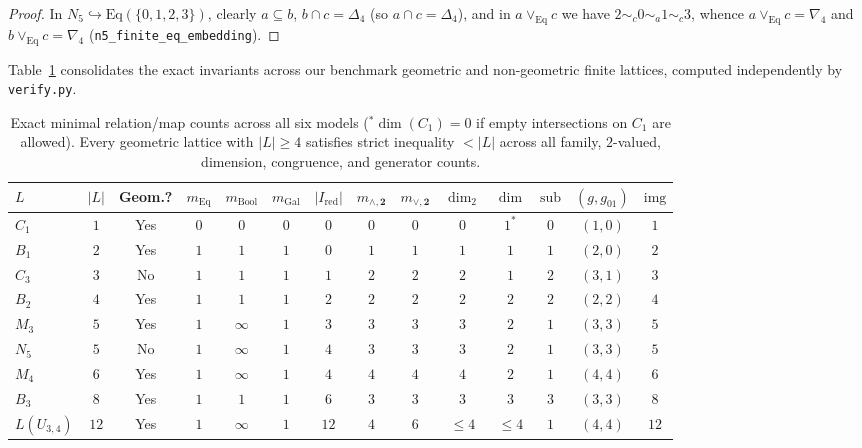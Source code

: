 \documentclass[11pt]{article}
\theoremstyle{definition}
\theoremstyle{remark}
\newcommand{\Eq}{\mathrm{Eq}}
\newcommand{\BoolTwo}{\mathbf{2}}
\begin{document}
\begin{proof}
In $N_5 \hookrightarrow \Eq(\{0,1,2,3\})$, clearly $a \subseteq b$, $b \cap c = \Delta_4$ (so $a \cap c = \Delta_4$), and in $a \vee_{\Eq} c$ we have $2 \sim_c 0 \sim_a 1 \sim_c 3$, whence $a \vee_{\Eq} c = \nabla_4$ and $b \vee_{\Eq} c = \nabla_4$ (\texttt{n5\_finite\_eq\_embedding}).
\end{proof}

Table~\ref{tab:invariants} consolidates the exact invariants across our benchmark geometric and non-geometric finite lattices, computed independently by \texttt{verify.py}.

\begin{table}[htbp]
\centering
\small
\setlength{\tabcolsep}{4.3pt}
\begin{tabular}{@{}lccccccccccccc@{}}
\toprule
$L$ & $|L|$ & Geom.? & $m_{\Eq}$ & $m_{\mathrm{Bool}}$ & $m_{\mathrm{Gal}}$ & $|I_{\mathrm{red}}|$ & $m_{\wedge,\BoolTwo}$ & $m_{\vee,\BoolTwo}$ & $\dim_2$ & $\dim$ & $\mathrm{sub}$ & $(g, g_{01})$ & $\mathrm{img}$ \\
\midrule
$C_1$          & $1$  & Yes & $0$ & $0$      & $0$ & $0$ & $0$ & $0$ & $0$ & $1^\ast$ & $0$ & $(1,0)$ & $1$ \\
$B_1$          & $2$  & Yes & $1$ & $1$      & $1$ & $0$ & $1$ & $1$ & $1$ & $1$      & $1$ & $(2,0)$ & $2$ \\
$C_3$          & $3$  & No  & $1$ & $1$      & $1$ & $1$ & $2$ & $2$ & $2$ & $1$      & $2$ & $(3,1)$ & $3$ \\
$B_2$          & $4$  & Yes & $1$ & $1$      & $1$ & $2$ & $2$ & $2$ & $2$ & $2$      & $2$ & $(2,2)$ & $4$ \\
$M_3$          & $5$  & Yes & $1$ & $\infty$ & $1$ & $3$ & $3$ & $3$ & $3$ & $2$      & $1$ & $(3,3)$ & $5$ \\
$N_5$          & $5$  & No  & $1$ & $\infty$ & $1$ & $4$ & $3$ & $3$ & $3$ & $2$      & $1$ & $(3,3)$ & $5$ \\
$M_4$          & $6$  & Yes & $1$ & $\infty$ & $1$ & $4$ & $4$ & $4$ & $4$ & $2$      & $1$ & $(4,4)$ & $6$ \\
$B_3$          & $8$  & Yes & $1$ & $1$      & $1$ & $6$ & $3$ & $3$ & $3$ & $3$      & $3$ & $(3,3)$ & $8$ \\
$L(U_{3,4})$   & $12$ & Yes & $1$ & $\infty$ & $1$ & $12$& $4$ & $6$ & $\le 4$ & $\le 4$ & $1$ & $(4,4)$ & $12$ \\
\bottomrule
\end{tabular}
\caption{Exact minimal relation/map counts across all six models ($^\ast\dim(C_1)=0$ if empty intersections on $C_1$ are allowed). Every geometric lattice with $|L| \ge 4$ satisfies strict inequality $< |L|$ across all family, $2$-valued, dimension, congruence, and generator counts.}
\label{tab:invariants}
\end{table}
\end{document}
